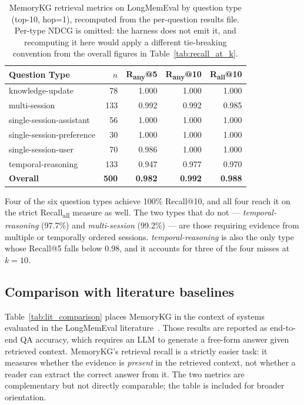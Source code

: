 \documentclass[11pt,a4paper]{article}
\begin{document}
\begin{table}[H]
\centering
\caption{MemoryKG retrieval metrics on LongMemEval by question type (top-10, hop=1),
         recomputed from the per-question results file. Per-type NDCG is omitted:
         the harness does not emit it, and recomputing it here would apply a
         different tie-breaking convention from the overall figures in
         Table~\ref{tab:recall_at_k}.}
\label{tab:type_results}
\begin{tabular}{lrrrr}
  \toprule
  \textbf{Question Type} & \textbf{$n$} & \textbf{R\textsubscript{any}@5} & \textbf{R\textsubscript{any}@10} & \textbf{R\textsubscript{all}@10} \\
  \midrule
  knowledge-update          &  78 & 1.000 & 1.000 & 1.000 \\
  multi-session             & 133 & 0.992 & 0.992 & 0.985 \\
  single-session-assistant  &  56 & 1.000 & 1.000 & 1.000 \\
  single-session-preference &  30 & 1.000 & 1.000 & 1.000 \\
  single-session-user       &  70 & 0.986 & 1.000 & 1.000 \\
  temporal-reasoning        & 133 & 0.947 & 0.977 & 0.970 \\
  \midrule
  \textbf{Overall}          & \textbf{500} & \textbf{0.982} & \textbf{0.992} & \textbf{0.988} \\
  \bottomrule
\end{tabular}
\end{table}

Four of the six question types achieve 100\% Recall@10, and all four reach it on
the strict Recall\textsubscript{all} measure as well.
The two types that do not --- \textit{temporal-reasoning} (97.7\%) and
\textit{multi-session} (99.2\%) --- are those requiring evidence from multiple
or temporally ordered sessions.
\textit{temporal-reasoning} is also the only type whose Recall@5 falls below
0.98, and it accounts for three of the four misses at $k{=}10$.

\subsection{Comparison with literature baselines}

Table~\ref{tab:lit_comparison} places MemoryKG in the context of systems
evaluated in the LongMemEval literature~\citep{wang2024longmemeval}.
Those results are reported as end-to-end QA accuracy, which requires an LLM to
generate a free-form answer given retrieved context.
MemoryKG's retrieval recall is a strictly easier task: it measures whether the
evidence is \emph{present} in the retrieved context, not whether a reader can
extract the correct answer from it.
The two metrics are complementary but not directly comparable; the table is
included for broader orientation.
\end{document}
